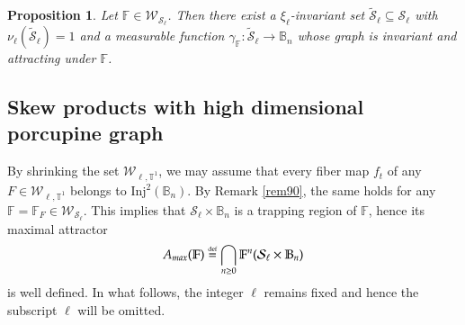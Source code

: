 \documentclass[11pt,reqno]{amsart}
\theoremstyle{plain}
\newtheorem{proposition}[theorem]{Proposition}
\newtheorem*{theorem A}{Theorem A}
\newtheorem*{theorem B}{Theorem B}
\newtheorem*{theorem C}{Theorem C}
\newtheorem*{theorem 1}{Theorem 1}
\newtheorem*{theorem 2}{Theorem 2}
\newtheorem*{theorem 3}{Theorem 3}
\newcommand{\eqdef}{\stackrel{\scriptscriptstyle\rm def}{=}}
\numberwithin{equation}{section}
\begin{document}
\begin{proposition}\label{p.thm000}
Let $\mathbb{F}\in \mathcal{W}_{\mathcal{S}_\ell}$.
Then there exist a $\xi_\ell$-invariant set $\widetilde{\mathcal{S}}_\ell\subseteq \mathcal{S}_\ell$ with $\nu_\ell(\widetilde{\mathcal{S}}_\ell )=1$ and a measurable function $\gamma_{\mathbb{F}} \colon \widetilde{\mathcal{S }}_\ell\to \mathbb{B}_n$ whose graph is invariant and attracting under $\mathbb{F}$.
\end{proposition}

\subsection{Skew products with high dimensional porcupine graph}\label{complete}

By shrinking the set $\mathcal{W}_{\ell, \mathbb{T}^1}$, we may assume that every fiber map $f_t$ of any $F \in \mathcal{W}_{\ell, \mathbb{T}^1}$ belongs to $\text{Inj}^2(\mathbb{B}_n)$.
By Remark \ref{rem90}, the same holds for any $\mathbb{F}=\mathbb{F}_{F} \in \mathcal{W}_{\mathcal{S}_\ell}$.
This implies that $\mathcal{S}_\ell \times \mathbb{B}_n$ is a trapping region of $\mathbb{F}$, hence its maximal attractor
\begin{equation}\label{e67}
  A_{max}(\mathbb{F})\eqdef \bigcap_{n\geq 0}\mathbb{F}^n(\mathcal{S_\ell} \times \mathbb{B}_n)
\end{equation}
is well defined.
In what follows, the integer $\ell$ remains fixed and hence the subscript $\ell$ will be omitted.
\end{document}
